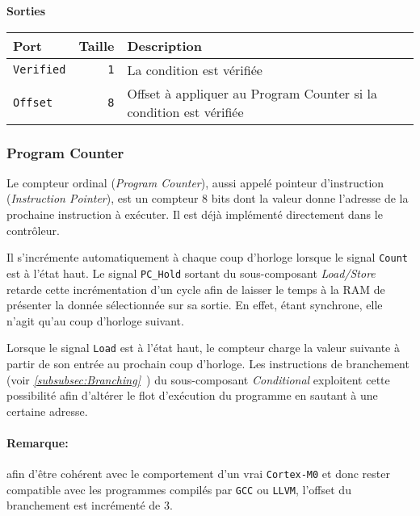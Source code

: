 \vspace{1em}
\textbf{Sorties}\\

\begin{tabular}{|l|r|l|}
\hline 
\textbf{Port} & \textbf{Taille} & \textbf{Description}\\

\hline
\texttt{Verified}	&  \texttt{1} & La condition est vérifiée\\
\hline
\texttt{Offset}		&  \texttt{8} & Offset à appliquer au Program Counter si la condition est vérifiée\\

\hline
\end{tabular}



\subsubsection{Program Counter}


Le compteur ordinal (\textit{Program Counter}), aussi appelé pointeur d'instruction (\textit{Instruction Pointer}),
est un compteur 8 bits dont la valeur donne l'adresse de la prochaine instruction à exécuter.
Il est déjà implémenté directement dans le contrôleur.

Il s'incrémente automatiquement à chaque coup d'horloge lorsque le signal \texttt{Count} est à l'état haut.
Le signal \texttt{PC\_Hold} sortant du sous-composant \textit{Load/Store} retarde cette incrémentation d'un cycle afin de laisser le temps à la RAM de présenter la donnée sélectionnée sur sa sortie.
En effet, étant synchrone, elle n'agit qu'au coup d'horloge suivant.

Lorsque le signal \texttt{Load} est à l'état haut, le compteur charge la valeur suivante à partir de son entrée au prochain coup d'horloge.
Les instructions de branchement (voir \textit{\ref{subsubsec:Branching}~}) du sous-composant \textit{Conditional} exploitent cette possibilité
afin d'altérer le flot d'exécution du programme en sautant à une certaine adresse.

\paragraph{Remarque:} afin d'être cohérent avec le comportement d'un vrai \texttt{Cortex-M0} et donc rester compatible avec les programmes compilés par \texttt{GCC} ou \texttt{LLVM},
l'offset du branchement est incrémenté de 3.

